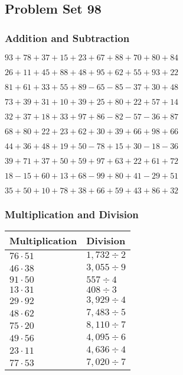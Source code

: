 \hypertarget{problem-set-98}{%
\subsection{Problem Set 98}\label{problem-set-98}}

\hypertarget{addition-and-subtraction}{%
\subsubsection{Addition and
Subtraction}\label{addition-and-subtraction}}

\(93+78+37+15+23+67+88+70+80+84\)

\(26+11+45+88+48+95+62+55+93+22\)

\(81+61+33+55+89-65-85-37+30+48\)

\(73+39+31+10+39+25+80+22+57+14\)

\(32+37+18+33+97+86-82-57-36+87\)

\(68+80+22+23+62+30+39+66+98+66\)

\(44+36+48+19+50-78+15+30-18-36\)

\(39+71+37+50+59+97+63+22+61+72\)

\(18-15+60+13+68-99+80+41-29+51\)

\(35+50+10+78+38+66+59+43+86+32\)

\hypertarget{multiplication-and-division}{%
\subsubsection{Multiplication and
Division}\label{multiplication-and-division}}

\begin{longtable}[]{@{}ll@{}}
\toprule
Multiplication & Division\tabularnewline
\midrule
\endhead
\(76\cdot51\) & \(1,732÷2\)\tabularnewline
\(46\cdot38\) & \(3,055÷9\)\tabularnewline
\(91\cdot50\) & \(557÷4\)\tabularnewline
\(13\cdot31\) & \(408÷3\)\tabularnewline
\(29\cdot92\) & \(3,929÷4\)\tabularnewline
\(48\cdot62\) & \(7,483÷5\)\tabularnewline
\(75\cdot20\) & \(8,110 ÷7\)\tabularnewline
\(49\cdot56\) & \(4,095÷6\)\tabularnewline
\(23\cdot11\) & \(4,636÷4\)\tabularnewline
\(77\cdot53\) & \(7,020÷7\)\tabularnewline
\bottomrule
\end{longtable}
